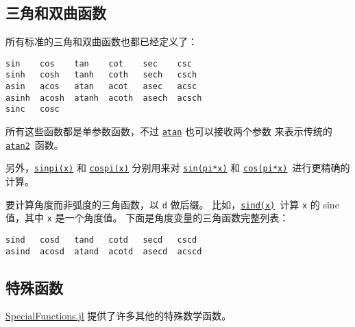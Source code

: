 \hypertarget{16706884854236336909}{}


\subsection{三角和双曲函数}



所有标准的三角和双曲函数也都已经定义了：




\begin{lstlisting}
sin    cos    tan    cot    sec    csc
sinh   cosh   tanh   coth   sech   csch
asin   acos   atan   acot   asec   acsc
asinh  acosh  atanh  acoth  asech  acsch
sinc   cosc
\end{lstlisting}



所有这些函数都是单参数函数，不过 \hyperlink{16445804261034090556}{\texttt{atan}} 也可以接收两个参数 来表示传统的 \href{https://en.wikipedia.org/wiki/Atan2}{\texttt{atan2}} 函数。



另外，\hyperlink{16554510911661822298}{\texttt{sinpi(x)}} 和 \hyperlink{2974547424856180253}{\texttt{cospi(x)}} 分别用来对 \hyperlink{10540279982054240733}{\texttt{sin(pi*x)}} 和 \hyperlink{10355926621556840804}{\texttt{cos(pi*x)}} 进行更精确的计算。



要计算角度而非弧度的三角函数，以 \texttt{d} 做后缀。 比如，\hyperlink{38337471195460170}{\texttt{sind(x)}} 计算 \texttt{x} 的 sine 值，其中 \texttt{x} 是一个角度值。 下面是角度变量的三角函数完整列表：




\begin{lstlisting}
sind   cosd   tand   cotd   secd   cscd
asind  acosd  atand  acotd  asecd  acscd
\end{lstlisting}



\hypertarget{17986622034630654775}{}


\subsection{特殊函数}



\href{https://github.com/JuliaMath/SpecialFunctions.jl}{SpecialFunctions.jl} 提供了许多其他的特殊数学函数。



\hypertarget{9739813100592614250}{}


